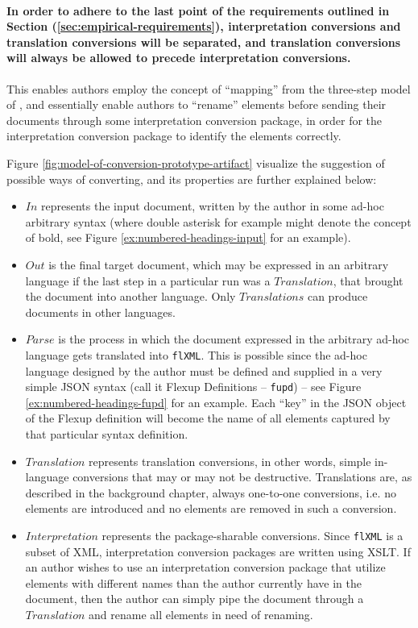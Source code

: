 \documentclass{scrreprt}
\begin{document}
\paragraph{In order to adhere to the last point of the requirements outlined in Section (\ref{sec:empirical-requirements}), interpretation conversions and translation conversions will be separated, and translation conversions will always be allowed to precede interpretation conversions.} This enables authors employ the concept of ``mapping'' from the three-step model of \citet{goldfarb}, and essentially enable authors to ``rename'' elements before sending their documents through some interpretation conversion package, in order for the interpretation conversion package to identify the elements correctly.

Figure \ref{fig:model-of-conversion-prototype-artifact} visualize the suggestion of possible ways of converting, and its properties are further explained below:

\begin{itemize}

\item $In$ represents the input document, written by the author in some ad-hoc arbitrary syntax (where double asterisk for example might denote the concept of bold, see Figure \ref{ex:numbered-headings-input} for an example).

\item $Out$ is the final target document, which may be expressed in an arbitrary language if the last step in a particular run was a $Translation$, that brought the document into another language. Only $Translations$ can produce documents in other languages.

\item $Parse$ is the process in which the document expressed in the arbitrary ad-hoc language gets translated into \texttt{flXML}. This is possible since the ad-hoc language designed by the author must be defined and supplied in a very simple JSON syntax (call it Flexup Definitions -- \texttt{fupd}) -- see Figure \ref{ex:numbered-headings-fupd} for an example. Each ``key'' in the JSON object of the Flexup definition will become the name of all elements captured by that particular syntax definition.

\item $Translation$ represents translation conversions, in other words, simple in-language conversions that may or may not be destructive. Translations are, as described in the background chapter, always one-to-one conversions, i.e. no elements are introduced and no elements are removed in such a conversion.

\item $Interpretation$ represents the package-sharable conversions. Since \texttt{flXML} is a subset of XML, interpretation conversion packages are written using XSLT. If an author wishes to use an interpretation conversion package that utilize elements with different names than the author currently have in the document, then the author can simply pipe the document through a $Translation$ and rename all elements in need of renaming.

\end{itemize}
\end{document}
